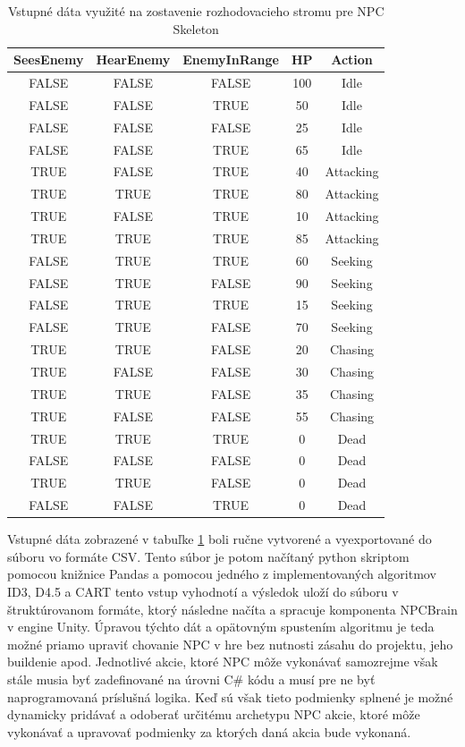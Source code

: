 \documentclass[slovak, master]{diploma}
\begin{document}
\begin{table}[!ht]
    \centering
    \begin{tabular}{|c|c|c|c|c|}
    \hline
        \textbf{SeesEnemy} & \textbf{HearEnemy} & \textbf{EnemyInRange} & \textbf{HP} & \textbf{Action} \\ \hline
        FALSE & FALSE & FALSE & 100 & Idle \\ 
        FALSE & FALSE & TRUE & 50 & Idle \\ 
        FALSE & FALSE & FALSE & 25 & Idle \\ 
        FALSE & FALSE & TRUE & 65 & Idle \\ 
        TRUE & FALSE & TRUE & 40 & Attacking \\ 
        TRUE & TRUE & TRUE & 80 & Attacking \\ 
        TRUE & FALSE & TRUE & 10 & Attacking \\ 
        TRUE & TRUE & TRUE & 85 & Attacking \\ 
        FALSE & TRUE & TRUE & 60 & Seeking \\ 
        FALSE & TRUE & FALSE & 90 & Seeking \\ 
        FALSE & TRUE & TRUE & 15 & Seeking \\ 
        FALSE & TRUE & FALSE & 70 & Seeking \\ 
        TRUE & TRUE & FALSE & 20 & Chasing \\ 
        TRUE & FALSE & FALSE & 30 & Chasing \\ 
        TRUE & TRUE & FALSE & 35 & Chasing \\ 
        TRUE & FALSE & FALSE & 55 & Chasing \\ 
        TRUE & TRUE & TRUE & 0 & Dead \\ 
        FALSE & FALSE & FALSE & 0 & Dead \\ 
        TRUE & TRUE & FALSE & 0 & Dead \\ 
        FALSE & FALSE & TRUE & 0 & Dead \\ \hline
    \end{tabular}
    \caption{Vstupné dáta využité na zostavenie rozhodovacieho stromu pre NPC Skeleton}
    \label{tab:skeletonActionRaw}
\end{table}

Vstupné dáta zobrazené v tabuľke \ref{tab:skeletonActionRaw} boli ručne vytvorené a vyexportované do súboru vo formáte CSV. Tento súbor je potom načítaný python skriptom pomocou knižnice Pandas a pomocou jedného z implementovaných algoritmov ID3, D4.5 a CART tento vstup vyhodnotí a výsledok uloží do súboru v štruktúrovanom formáte, ktorý následne načíta a spracuje komponenta NPCBrain v engine Unity. Úpravou týchto dát a opätovným spustením algoritmu je teda možné priamo upraviť chovanie NPC v hre bez nutnosti zásahu do projektu, jeho buildenie apod. Jednotlivé akcie, ktoré NPC môže vykonávať samozrejme však stále musia byť zadefinované na úrovni C\# kódu a musí pre ne byť naprogramovaná príslušná logika. Keď sú však tieto podmienky splnené je možné dynamicky pridávať a odoberať určitému archetypu NPC akcie, ktoré môže vykonávať a upravovať podmienky za ktorých daná akcia bude vykonaná. 
\end{document}
